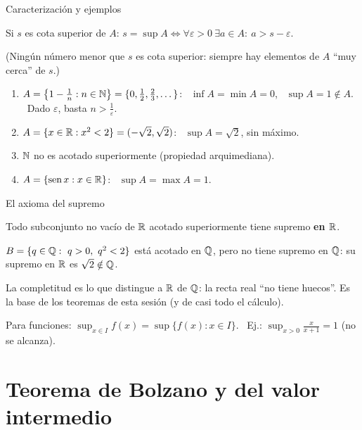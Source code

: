 \documentclass[10pt,aspectratio=169]{beamer}
\begin{document}
\begin{frame}{Caracterización y ejemplos}
  \begin{teorema}
    Si $s$ es cota superior de $A$: \quad $s=\sup A\iff\forall\varepsilon>0\ \exists a\in A:\ a>s-\varepsilon$.
  \end{teorema}
  \small (Ningún número menor que $s$ es cota superior: siempre hay elementos de $A$ ``muy cerca'' de $s$.)
  \normalsize
  \begin{ejemplo}
    \begin{enumerate}
      \item $A=\left\{1-\frac1n:n\in\mathbb{N}\right\}=\{0,\frac12,\frac23,\dots\}$: \ $\inf A=\min A=0$, \ $\sup A=1\notin A$.
        \ Dado $\varepsilon$, basta $n>\frac1\varepsilon$.
      \item $A=\{x\in\mathbb{R}:x^2<2\}=(-\sqrt2,\sqrt2)$: \ $\sup A=\sqrt2$, sin máximo.
      \item $\mathbb{N}$ no es acotado superiormente (propiedad arquimediana).
      \item $A=\{\operatorname{sen} x:x\in\mathbb{R}\}$: \ $\sup A=\max A=1$.
    \end{enumerate}
  \end{ejemplo}
\end{frame}

\begin{frame}{El axioma del supremo}
  \begin{teorema}
    Todo subconjunto no vacío de $\mathbb{R}$ acotado superiormente tiene supremo \textbf{en $\mathbb{R}$}.
  \end{teorema}
  \begin{ejemplo}[$\Q$ no es completo]
    $B=\{q\in\mathbb{Q}:\ q>0,\ q^2<2\}$ está acotado en $\Q$, pero no tiene supremo en $\Q$: su supremo en $\mathbb{R}$ es $\sqrt2\notin\mathbb{Q}$.
  \end{ejemplo}
  \begin{idea}
    La completitud es lo que distingue a $\mathbb{R}$ de $\Q$: la recta real ``no tiene huecos''. Es la base de los teoremas de esta sesión
    (y de casi todo el cálculo).
  \end{idea}
  \begin{observacion}
    Para funciones: $\sup_{x\in I}f(x)=\sup\{f(x):x\in I\}$. \ Ej.: $\sup_{x>0}\frac{x}{x+1}=1$ (no se alcanza).
  \end{observacion}
\end{frame}

\section{Teorema de Bolzano y del valor intermedio}
\end{document}
